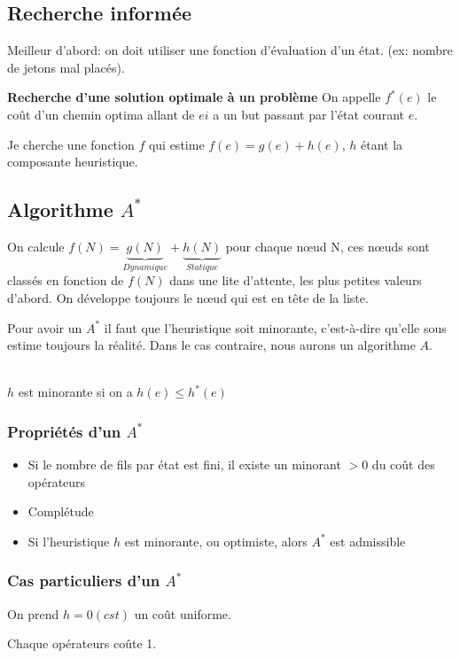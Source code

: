 \documentclass[12pt,a4paper,openany]{book}
\begin{document}
		\subsection{Recherche informée}
		Meilleur d'abord: on doit utiliser une fonction d'évaluation d'un état. (ex: nombre de jetons mal placés).

		\textbf{Recherche d'une solution optimale à un problème} On appelle $f^*(e)$ le coût d'un chemin optima allant de $ei$ a un but passant par l'état courant $e$.

		Je cherche une fonction $f$ qui estime $f(e)=g(e)+h(e)$, $h$ étant la composante heuristique.

		\subsection{Algorithme $A^*$}
		On calcule $f(N) = \underbrace{g(N)}_{Dynamique} + \underbrace{h(N)}_{Statique}$ pour chaque nœud N, ces nœuds sont classés en fonction de
		$f(N)$ dans une lite d'attente, les plus petites valeurs d'abord. On développe toujours le nœud qui est en tête de la liste.

		Pour avoir un $A^*$ il faut que l'heuristique soit minorante, c'est-à-dire qu'elle sous estime toujours la réalité. Dans le cas contraire, nous aurons
		un algorithme $A$.
		
		\begin{definition}~\\
			$h$ est minorante si on a $h(e) \leq h^*(e)$
		\end{definition}
		\subsubsection{Propriétés d'un $A^*$}
		\begin{itemize}
			\item Si le nombre de fils par état est fini, il existe un minorant $>0$ du coût des opérateurs
			\item Complétude
			\item Si l'heuristique $h$ est minorante, ou optimiste, alors $A^*$ est admissible
		\end{itemize}

		\subsubsection{Cas particuliers d'un $A^*$}
		On prend $h=0(cst)$ un coût uniforme.

		\begin{exemple}
			Chaque opérateurs coûte 1.
		\end{exemple}
\end{document}
